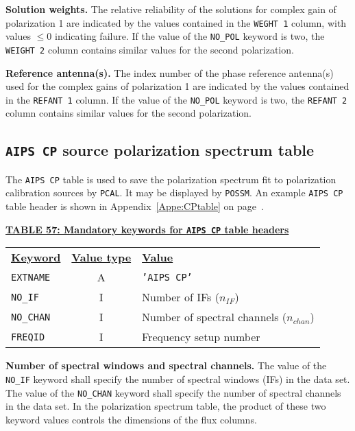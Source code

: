 \documentclass[twoside]{article}
\newcommand{\nif}{$n_{IF}$}
\newcommand{\nchan}{$n_{chan}$}
\begin{document}
{\bf Solution weights.} The relative reliability of the solutions for
complex gain of polarization 1 are indicated by the values contained
in the {\tt WEGHT 1} column, with values $\leq 0$ indicating failure.
If the value of the {\tt NO\_POL} keyword is two, the {\tt WEIGHT 2}
column contains similar values for the second polarization.

{\bf Reference antenna(s).} The index number of the phase reference
antenna(s) used for the complex gains of polarization 1 are indicated
by the values contained in the {\tt REFANT 1} column.  If the value of
the {\tt NO\_POL} keyword is two, the {\tt REFANT 2} column contains
similar values for the second polarization.

\subsection{{\tt AIPS CP} source polarization spectrum table}
\label{s:CP}

The {\tt AIPS CP} table is used to save the polarization spectrum fit
to polarization calibration sources by {\tt PCAL}\@.  It may be
displayed by {\tt POSSM}\@.  An example {\tt AIPS CP} table header is
shown in Appendix~\ref{Appe:CPtable} on page~\pageref{Appe:CPtable}.

\begin{center}
\underline{\bf{TABLE 57: Mandatory keywords for {\tt AIPS CP} table
    headers}}\\
\begin{tabular}{lcl}
\noalign{\vspace{2pt}} \label{ta:CPkeys}
\underline{{\bf Keyword}} & \underline{\bf{Value type}} &
    \underline{\bf{Value\vphantom{y}}} \\
\noalign{\vspace{2pt}}
{\tt EXTNAME}  & A & {\tt 'AIPS CP'}  \\
{\tt NO\_IF}   & I & Number of IFs (\nif)\\
{\tt NO\_CHAN} & I & Number of spectral channels (\nchan) \\
{\tt FREQID}   & I & Frequency setup number
\end{tabular}
\end{center}

{\bf Number of spectral windows and spectral channels.} The value of
the {\tt NO\_IF} keyword shall specify the number of spectral windows
(IFs) in the data set.  The value of the {\tt NO\_CHAN} keyword shall
specify the number of spectral channels in the data set.  In the
polarization spectrum table, the product of these two keyword values
controls the dimensions of the flux columns.
\end{document}
